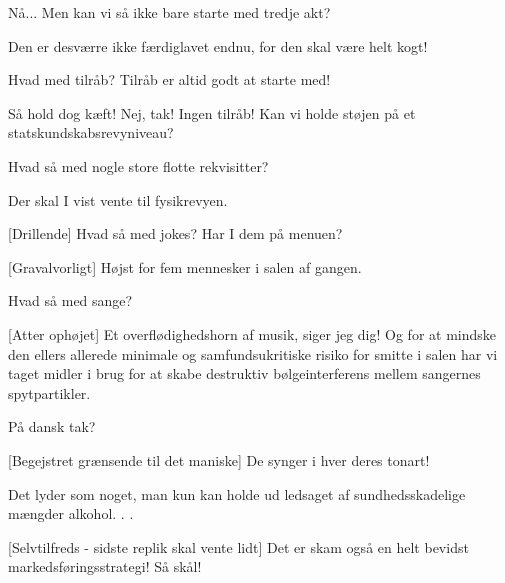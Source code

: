 \documentclass[a4paper,11pt]{article}
\begin{document}
\begin{sketch}
 Nå... Men kan vi så ikke bare starte med tredje akt?

 Den er desværre ikke færdiglavet endnu, for den skal være helt kogt!

 Hvad med tilråb? Tilråb er altid godt at starte med!


 Så hold dog kæft! Nej, tak! Ingen tilråb! Kan vi holde støjen på et statskundskabsrevyniveau?


 Hvad så med nogle store flotte rekvisitter?

 Der skal I vist vente til fysikrevyen.

[Drillende] Hvad så med jokes? Har I dem på menuen?

[Gravalvorligt] Højst for fem mennesker i salen af gangen.

 Hvad så med sange?

[Atter ophøjet] Et overflødighedshorn af musik, siger jeg dig! Og for at mindske den ellers allerede minimale og samfundsukritiske risiko for smitte i salen har vi taget midler i brug for at skabe destruktiv bølgeinterferens mellem sangernes spytpartikler.

 På dansk tak?

[Begejstret grænsende til det maniske] De synger i hver deres tonart!

 Det lyder som noget, man kun kan holde ud ledsaget af sundhedsskadelige mængder alkohol. . .

[Selvtilfreds - sidste replik skal vente lidt] Det er skam også en helt bevidst markedsføringsstrategi! Så skål!

\end{sketch}
\end{document}
